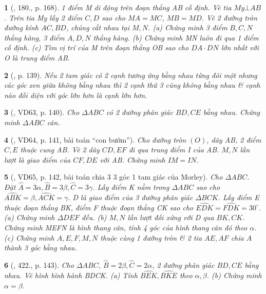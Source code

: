 \documentclass{article}
\newtheorem{baitoan}{}
\begin{document}
\begin{baitoan}[\cite{Tuyen_Toan_9_old}, 180., p. 168]
	1 điểm M di động trên đoạn thẳng AB cố định. Vẽ tia $My\bot AB$. Trên tia My lấy 2 điểm $C,D$ sao cho $MA = MC$, $MB = MD$. Vẽ 2 đường tròn đường kính $AC,BD$, chúng cắt nhau tại $M,N$. (a) Chứng minh 3 điểm $B,C,N$ thẳng hàng, 3 điểm $A,D,N$ thẳng hàng. (b) Chứng minh MN luôn đi qua 1 điểm cố định. (c) Tìm vị trí của M trên đoạn thẳng OB sao cho $DA\cdot DN$ lớn nhất với O là trung điểm AB.
\end{baitoan}

\begin{baitoan}[\cite{Binh_Toan_9_tap_2}, p. 139]
	Nếu 2 tam giác có 2 cạnh tương ứng bằng nhau từng đôi một nhưng các góc xen giữa không bằng nhau thì 2 cạnh thứ 3 cũng không bằng nhau \& cạnh nào đối diện với góc lớn hơn là cạnh lớn hơn.
\end{baitoan}

\begin{baitoan}[\cite{Binh_Toan_9_tap_2}, VD63, p. 140]
	Cho $\Delta ABC$ có 2 đường phân giác $BD,CE$ bằng nhau. Chứng minh $\Delta ABC$ cân.
\end{baitoan}

\begin{baitoan}[\cite{Binh_Toan_9_tap_2}, VD64, p. 141, bài toán ``con bướm'']
	Cho đường tròn $(O)$, dây AB, 2 điểm $C,E$ thuộc cung AB. Vẽ 2 dây $CD,EF$ đi qua trung điểm I của AB. $M,N$ lần lượt là giao điểm của $CF,DE$ với AB. Chứng minh $IM = IN$.
\end{baitoan}

\begin{baitoan}[\cite{Binh_Toan_9_tap_2}, VD65, p. 142, bài toán chia 3 3 góc 1 tam giác của Morley]
	Cho $\Delta ABC$. Đặt $\widehat{A} = 3\alpha,\widehat{B} = 3\beta,\widehat{C} = 3\gamma$. Lấy điểm K nằm trong $\Delta ABC$ sao cho $\widehat{ABK} = \beta,\widehat{ACK} = \gamma$. D là giao điểm của 3 đường phân giác $\Delta BCK$. Lấy điểm E thuộc đoạn thẳng BK, điểm F thuộc đoạn thẳng CK sao cho $\widehat{EDK} = \widehat{FDK} = 30^\circ$. (a) Chứng minh $\Delta DEF$ đều. (b) $M,N$ lần lượt đối xứng với D qua $BK,CK$. Chứng minh MEFN là hình thang cân, tính 4 góc của hình thang cân đó theo $\alpha$. (c) Chứng minh $A,E,F,M,N$ thuộc cùng 1 đường tròn \& 2 tia $AE,AF$ chia $\widehat{A}$ thành 3 góc bằng nhau.
\end{baitoan}

\begin{baitoan}[\cite{Binh_Toan_9_tap_2}, 422., p. 143]
	Cho $\Delta ABC$, $\widehat{B} = 2\beta,\widehat{C} = 2\alpha$, 2 đường phân giác $BD,CE$ bằng nhau. Vẽ hình bình hành BDCK. (a) Tính $\widehat{BEK},\widehat{BKE}$ theo $\alpha,\beta$. (b) Chứng minh $\alpha = \beta$.
\end{baitoan}
\end{document}
